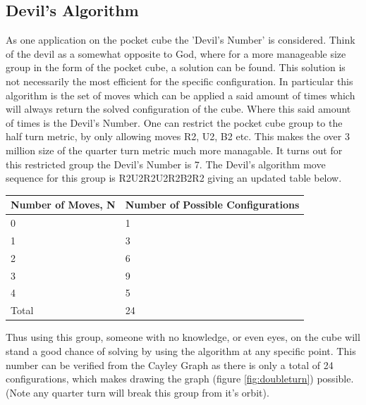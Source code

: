 \documentclass{article}
\begin{document}
\subsection{Devil's Algorithm}

As one application on the pocket cube the 'Devil's Number' is considered. Think of the devil as a somewhat opposite to God, where for a more manageable size group in the form of the pocket cube, a solution can be found. This solution is not necessarily the most efficient for the specific configuration. In particular this algorithm is the set of moves which can be applied a said amount of times which will always return the solved configuration of the cube. Where this said amount of times is the Devil's Number. One can restrict the pocket cube group to the half turn metric, by only allowing moves R2, U2, B2 etc.
This makes the over 3 million size of the quarter turn metric much more managable. It turns out for this restricted group the Devil's Number is 7\cite{Devil}.
The Devil's algorithm move sequence for this group is R2U2R2U2R2B2R2 giving an updated table below.

\begin{center}
\label{:thistletab}
    \begin{tabular}{ | p{6cm} | p{6cm}|}
    \hline
    Number of Moves, N  & Number of Possible Configurations \\ \hline
     0 & 1\\ \hline
     1 & 3\\ \hline
     2 & 6\\ \hline
     3 & 9\\ \hline
     4 & 5\\ \hline
     Total & 24\\ \hline
    \end{tabular}
\end{center}

Thus using this group, someone with no knowledge, or even eyes, on the cube will stand a good chance of solving by using the algorithm at any specific point. This number can be verified from the Cayley Graph as there is only a total of 24 configurations, which makes drawing the graph (figure \ref{fig:doubleturn})\cite{Devil} possible. (Note any quarter turn will break this group from it's orbit).
\end{document}
